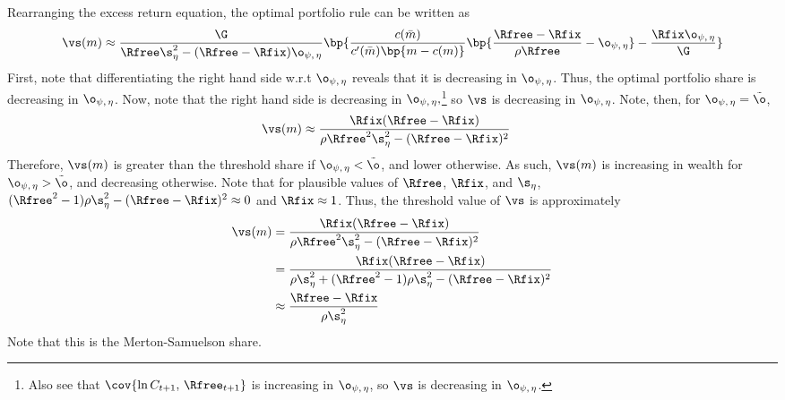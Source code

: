 Rearranging the excess return equation, the optimal portfolio rule can be written as
\[
    \vs(m) \approx \frac{\G}{\Rfree\s_{\eta}^2 - (\Rfree - \Rfix)\o_{\psi,\,\eta}}\bp{\frac{c(\bar{m})}{c'(\bar{m})\bp{m - c(m)}}\bp{\frac{\Rfree - \Rfix}{\rho\Rfree} - \o_{\psi,\,\eta}} - \frac{\Rfix\o_{\psi,\,\eta}}{\G}}
\]
First, note that differentiating the right hand side w.r.t $\o_{\psi,\,\eta}$ reveals that it is decreasing in $\o_{\psi,\,\eta}$. Thus, the optimal portfolio share is decreasing in $\o_{\psi,\,\eta}$. Now, note that the right hand side is decreasing in $\o_{\psi,\,\eta},$\footnote{Also see that $\cov{\ln C_{t+1},\,\Rfree_{t+1}}$ is increasing in $\o_{\psi,\,\eta}$, so $\vs$ is decreasing in $\o_{\psi,\,\eta}$.} so $\vs$ is decreasing in $\o_{\psi,\,\eta}$. Note, then, for $\o_{\psi,\,\eta} = \tilde{\o}$,
\begin{align*}
    \vs(m) &\approx \frac{\Rfix(\Rfree - \Rfix)}{\rho\Rfree^2\s_{\eta}^2 - (\Rfree - \Rfix)^2}
\end{align*}
Therefore, $\vs(m)$ is greater than the threshold share if $\o_{\psi,\,\eta} < \tilde{\o}$, and lower otherwise. As such, $\vs(m)$ is increasing in wealth for $\o_{\psi,\,\eta} > \tilde{\o}$, and decreasing otherwise. Note that for plausible values of $\Rfree$, $\Rfix$, and $\s_{\eta}$, $(\Rfree^2 - 1)\rho\s_{\eta}^2 - (\Rfree - \Rfix)^2 \approx 0$ and $\Rfix \approx 1$. Thus, the threshold value of $\vs$ is approximately
\begin{align*}
    \vs(m) &= \frac{\Rfix(\Rfree - \Rfix)}{\rho\Rfree^2\s_{\eta}^2 - (\Rfree - \Rfix)^2}\\
    &= \frac{\Rfix(\Rfree - \Rfix)}{\rho\s_{\eta}^2 + (\Rfree^2 - 1)\rho\s_{\eta}^2 - (\Rfree - \Rfix)^2}\\
    &\approx \frac{\Rfree - \Rfix}{\rho\s_{\eta}^2}
\end{align*}
Note that this is the Merton-Samuelson share.
